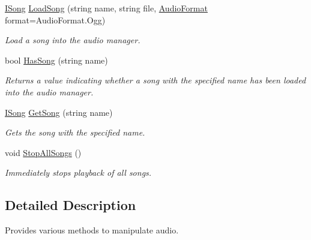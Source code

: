 \begin{DoxyCompactItemize}
\hyperlink{interface_tri_devs_1_1_tri_engine2_d_1_1_audio_1_1_i_song}{I\-Song} \hyperlink{interface_tri_devs_1_1_tri_engine2_d_1_1_audio_1_1_i_audio_manager_a2cc4303de5d40ef528d1441419cfc868}{Load\-Song} (string name, string file, \hyperlink{namespace_tri_devs_1_1_tri_engine2_d_1_1_audio_ae238794863562d9b6204219dd29019ff}{Audio\-Format} format=Audio\-Format.\-Ogg)
\begin{DoxyCompactList}\small\item\em Load a song into the audio manager. \end{DoxyCompactList}\item 
bool \hyperlink{interface_tri_devs_1_1_tri_engine2_d_1_1_audio_1_1_i_audio_manager_aa533d7ca59e6b1dc411a30aac107573d}{Has\-Song} (string name)
\begin{DoxyCompactList}\small\item\em Returns a value indicating whether a song with the specified name has been loaded into the audio manager. \end{DoxyCompactList}\item 
\hyperlink{interface_tri_devs_1_1_tri_engine2_d_1_1_audio_1_1_i_song}{I\-Song} \hyperlink{interface_tri_devs_1_1_tri_engine2_d_1_1_audio_1_1_i_audio_manager_a038099aae42270109b8c0078c116833f}{Get\-Song} (string name)
\begin{DoxyCompactList}\small\item\em Gets the song with the specified name. \end{DoxyCompactList}\item 
void \hyperlink{interface_tri_devs_1_1_tri_engine2_d_1_1_audio_1_1_i_audio_manager_a03b1337d37083a07161f9532c12fcb8f}{Stop\-All\-Songs} ()
\begin{DoxyCompactList}\small\item\em Immediately stops playback of all songs. \end{DoxyCompactList}\end{DoxyCompactItemize}


\subsection{Detailed Description}
Provides various methods to manipulate audio. 



